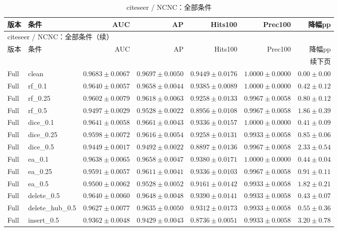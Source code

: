 \documentclass[UTF8,a4paper,11pt,fontset=fandol]{ctexart}
\begin{document}
{\footnotesize
\setlength{\tabcolsep}{3pt}
\begin{longtable}{llrrrrr}
\caption{citeseer / NCNC：全部条件}\\
\toprule
版本 & 条件 & AUC & AP & Hits100 & Prec100 & 降幅pp \\
\midrule
\endfirsthead
\multicolumn{7}{l}{citeseer / NCNC：全部条件（续）}\\
\toprule
版本 & 条件 & AUC & AP & Hits100 & Prec100 & 降幅pp \\
\midrule
\endhead
\midrule\multicolumn{7}{r}{续下页}\\
\endfoot
\bottomrule\endlastfoot
Full & clean & $0.9683\pm0.0067$ & $0.9697\pm0.0050$ & $0.9449\pm0.0176$ & $1.0000\pm0.0000$ & $0.00\pm0.00$ \\
Full & rf\_0.1 & $0.9640\pm0.0057$ & $0.9658\pm0.0044$ & $0.9385\pm0.0089$ & $1.0000\pm0.0000$ & $0.42\pm0.12$ \\
Full & rf\_0.25 & $0.9602\pm0.0079$ & $0.9618\pm0.0063$ & $0.9258\pm0.0133$ & $0.9967\pm0.0058$ & $0.80\pm0.12$ \\
Full & rf\_0.5 & $0.9497\pm0.0029$ & $0.9528\pm0.0022$ & $0.8956\pm0.0108$ & $0.9967\pm0.0058$ & $1.86\pm0.39$ \\
Full & dice\_0.1 & $0.9641\pm0.0058$ & $0.9661\pm0.0043$ & $0.9336\pm0.0157$ & $1.0000\pm0.0000$ & $0.41\pm0.09$ \\
Full & dice\_0.25 & $0.9598\pm0.0072$ & $0.9616\pm0.0054$ & $0.9258\pm0.0131$ & $0.9933\pm0.0058$ & $0.85\pm0.06$ \\
Full & dice\_0.5 & $0.9449\pm0.0017$ & $0.9492\pm0.0022$ & $0.8897\pm0.0136$ & $0.9967\pm0.0058$ & $2.33\pm0.54$ \\
Full & ea\_0.1 & $0.9638\pm0.0065$ & $0.9658\pm0.0047$ & $0.9380\pm0.0171$ & $1.0000\pm0.0000$ & $0.44\pm0.04$ \\
Full & ea\_0.25 & $0.9591\pm0.0057$ & $0.9611\pm0.0041$ & $0.9336\pm0.0103$ & $0.9967\pm0.0058$ & $0.91\pm0.11$ \\
Full & ea\_0.5 & $0.9500\pm0.0062$ & $0.9528\pm0.0052$ & $0.9161\pm0.0142$ & $0.9933\pm0.0058$ & $1.82\pm0.21$ \\
Full & delete\_0.5 & $0.9640\pm0.0060$ & $0.9648\pm0.0048$ & $0.9390\pm0.0141$ & $0.9933\pm0.0058$ & $0.43\pm0.07$ \\
Full & delete\_hub\_0.5 & $0.9627\pm0.0077$ & $0.9635\pm0.0050$ & $0.9312\pm0.0173$ & $0.9933\pm0.0058$ & $0.55\pm0.36$ \\
Full & insert\_0.5 & $0.9362\pm0.0048$ & $0.9429\pm0.0043$ & $0.8736\pm0.0051$ & $0.9933\pm0.0058$ & $3.20\pm0.78$ \\

\end{longtable}}
\end{document}
